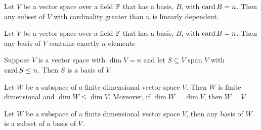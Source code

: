 \begin{corollary}
	Let $V$ be a vector space over a field $\mathbb{F}$ that has a basis, $B$, with $\operatorname{card} B=n$.
	Then any subset of $V$ with cardinality greater than $n$ is linearly dependent.
\end{corollary}

\begin{corollary}
	Let $V$ be a vector space over a field $\mathbb{F}$ that has a basis, $B$, with $\operatorname{card} B=n$.
	Then any basis of $V$ contains exactly $n$ elements
\end{corollary}

\begin{corollary}
	Suppose $V$ is a vector space with $\dim V=n$ and let $S\subseteq V$ span $V$ with $\operatorname{card} S\leq n$.
	Then $S$ is a basis of $V$.
\end{corollary}

\begin{thm}
	Let $W$ be a subspace of a finite dimensional vector space $V$.
	Then $W$ is finite dimensional and $\dim W\leq \dim V$.
	Moreover, if $\dim W = \dim V$, then $W=V$.
\end{thm}

\begin{corollary}
	Let $W$ be a subspace of a finite dimensional vector space $V$, then any basis of $W$ is a subset of a basis of $V$.
\end{corollary}
